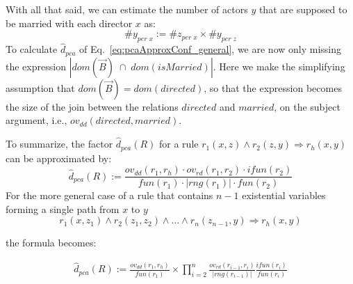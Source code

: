 With all that said, we can estimate the number of actors $y$ that are supposed to be married with each director $x$ as:
$$
 \#y_{per\;x} :=  \#z_{per \; x} \times \#y_{ per \; z}
$$
\noindent To calculate $\widehat{d}_{pca}$ of Eq.~\ref{eq:pcaApproxConf_general}, we are now only missing 
the expression $|dom(\vec{B})\;\cap\;dom(isMarried)|$. 
Here we make the simplifying assumption that $dom(\vec{B}) = dom(directed)$, so that the expression
becomes the size of the join between the relations $directed$ and $married$, on the subject argument, 
i.e., $ov_{dd}(directed,married)$.

To summarize, the factor $\widehat{d}_{pca}(R)$ for a rule $r_1(x,z)\wedge r_2(z,y) \Rightarrow r_h(x,y)$ can be approximated by:
\[
  \widehat{d}_{pca}(R) := \frac{ov_{dd}(r_1,r_h) \cdot ov_{rd}(r_1,r_2) \cdot ifun(r_2)  }{fun(r_1) \cdot |rng(r_1)| \cdot fun(r_2)}
\]
For the more general case of a rule that contains $n-1$ existential variables forming a single path from $x$ to $y$
$$
  r_1(x,z_1) \wedge r_2(z_1,z_2) \wedge ... \wedge r_n(z_{n-1},y) \Rightarrow r_h(x,y)
$$

\noindent the formula becomes:

\begin{eqnarray*}
  \widehat{d}_{pca}(R) := \frac{ov_{dd}(r_1,r_h)}{fun(r_1)}  \times 
  \prod_{i=2}^{n}\frac{ov_{rd}(r_{i-1},r_i) }{|rng(r_{i-1})|}\frac{ifun(r_i)}{fun(r_i)}
\end{eqnarray*}





